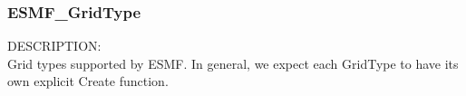 
% 
% 
% 
% 


 \subsubsection{ESMF\_GridType}
 
 {\sf DESCRIPTION:\\}
 Grid types supported by ESMF.  In general, we expect each GridType to have
 its own explicit Create function.
 
